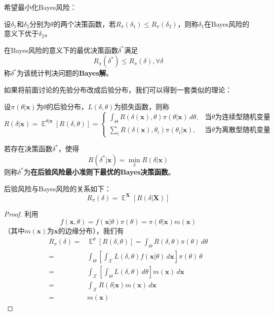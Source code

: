 \documentclass{ctexbook}
\DeclareMathOperator{\E}{\mathbb{E}}     %
\begin{document}
希望最小化Bayes风险：

\begin{definition}[Bayes解]
    设$\delta_1$和$\delta_2$分别为$\theta$的两个决策函数，若$R_\pi(\delta_1)\le R_\pi(\delta_2)$，则称$\delta_1$在Bayes风险的意义下优于$\delta_2$。

    在Bayes风险的意义下的最优决策函数$\delta^*$满足
    $$R_\pi(\delta^*)\le R_\pi(\delta),\forall \delta$$
    称$\delta^*$为该统计判决问题的\textbf{Bayes解}。
\end{definition}

如果将前面讨论的先验分布改成后验分布，我们可以得到一套类似的理论：

\begin{definition}[后验风险]
    设$\pi(\theta|\mathbf{x})$为$\theta$的后验分布，$L(\delta,\theta)$为损失函数，则称
    $$R(\delta|\mathbf{x})=\E^{\theta|\mathbf{x}}[R(\delta,\theta)]=\begin{cases}
        \int_{\Theta}R(\delta(\mathbf{x}),\theta)\pi(\theta|\mathbf{x})\,d\theta,&\text{当}\theta\text{为连续型随机变量}\\
        \sum_{i}R(\delta(\mathbf{x}),\theta_i)\pi(\theta_i|\mathbf{x}),&\text{当}\theta\text{为离散型随机变量}
    \end{cases}$$
\end{definition}

\begin{definition}[最优Bayes决策函数]
    若存在决策函数$\delta^*$，使得
    $$R(\delta^*|\mathbf{x})=\min_\delta R(\delta|\mathbf{x})$$
    则称$\delta^*$为\textbf{在后验风险最小准则下最优的Bayes决策函数}。
\end{definition}

\begin{proposition}
    后验风险与Bayes风险的关系如下：
    $$R_\pi(\delta)=\E^{\mathbf{X}}[R(\delta|\mathbf{X})]$$
\end{proposition}
\begin{proof}
    利用
    $$f(\mathbf{x},\theta)=f(\mathbf{x}|\theta)\pi(\theta)=\pi(\theta|\mathbf{x})m(\mathbf{x})$$
    （其中$m(\mathbf{x})$为$\mathbf{x}$的边缘分布），我们有
    \begin{align*}
        R_\pi(\delta)=&\E^\theta[R(\delta,\theta)]=\int_{\Theta}R(\delta,\theta)\pi(\theta)\,d\theta\\
        =&\int_{\Theta}\left[\int_{\mathcal{X}}L(\delta,\theta)f(\mathbf{x}|\theta)\,d\mathbf{x}\right]\pi(\theta)\,\theta\\
        =&\int_{\mathcal{X}}\left[\int_{\Theta}L(\delta,\theta)\,d\theta\right]m(\mathbf{x})\,d\mathbf{x}\\
        =&\int_{\mathcal{X}}R(\delta|\mathbf{x})m(\mathbf{x})\,d\mathbf{x}\\
        =&m(\mathbf{x})
    \end{align*}
\end{proof}
\end{document}

